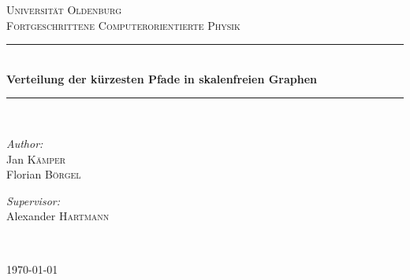 \begin{titlepage}
\begin{center}


\textsc{\LARGE Universität Oldenburg}\\[1.5cm]

\textsc{\Large Fortgeschrittene Computerorientierte Physik}\\[0.5cm]


\newcommand{\HRule}{\rule{\linewidth}{0.5mm}}
\HRule \\[0.4cm]
{ \huge \bfseries Verteilung der kürzesten Pfade in skalenfreien Graphen}\\[0.4cm]

\HRule \\[1.5cm]

\begin{minipage}{0.4\textwidth}
\begin{flushleft} \large
\emph{Author:}\\
Jan \textsc{K\"amper}\\
Florian \textsc{B\"orgel}
\end{flushleft}
\end{minipage}
\hfill
\begin{minipage}{0.4\textwidth}
\begin{flushright} \large
\emph{Supervisor:} \\
Alexander \textsc{Hartmann}
\end{flushright}
\end{minipage}
\\[3cm]
\vfill



{\large \today}

\end{center}

\end{titlepage}